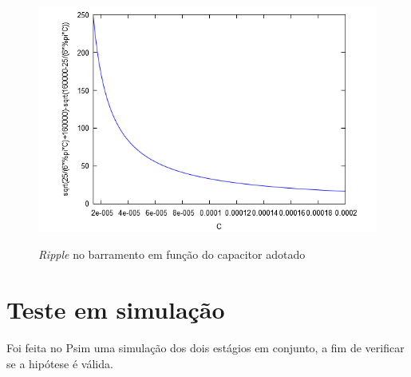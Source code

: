 \documentclass[
        12pt,
        openany, %
        oneside, %
        a4paper,			
        english,			
        brazil
        ]{abntbibufjf}
\begin{document}
\begin{figure}[!h]
	\centering
	\caption{\textit{Ripple} no barramento em função do capacitor adotado}
	\includegraphics[width=.95\linewidth,height=.80\textheight,keepaspectratio]{../GRAFICOS/cs5_img/cs5_6}
	\label{cs5_6}
\end{figure}

\section{Teste em simulação}

Foi feita no Psim uma simulação dos dois estágios em conjunto, a fim de verificar se a hipótese é válida.
\end{document}
